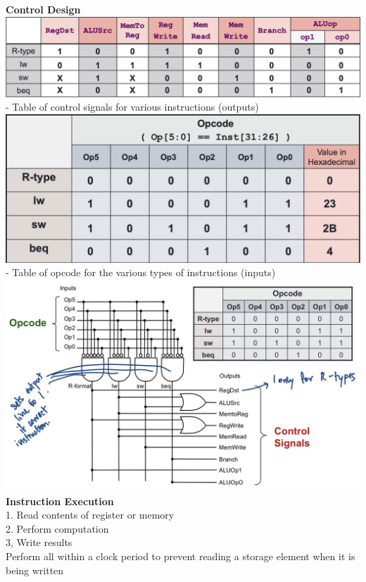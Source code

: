 \documentclass[10pt, a4paper]{article}
\begin{document}
\begin{multicols*}{3}
		\textbf{Control Design}\\
		\includegraphics[scale=.25]{./assets/controlTable}\\
		- Table of control signals for various instructions (outputs)\\
		\includegraphics[scale=.25]{./assets/opcodeTable}\\
		- Table of opcode for the various types of instructions (inputs)\\
		\includegraphics[scale=0.17]{./assets/controlCircuit}\\	
		
		\textbf{Instruction Execution}\\
		1. Read contents of register or memory\\
		2. Perform computation\\
		3, Write results\\
		Perform all within a clock period to prevent reading a storage element when it is being written\\
		

\end{multicols*}
\end{document}
